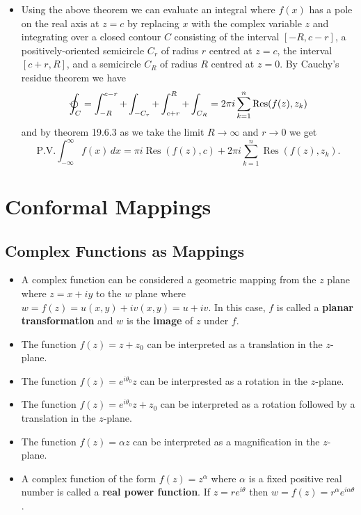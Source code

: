 \documentclass{article}
\newcommand{\Res}{\operatorname{Res}}
\begin{document}
\begin{itemize}
  \item Using the above theorem we can evaluate an integral where $f(x)$ has a pole on the real axis at $z = c$ by replacing $x$ with the complex variable $z$ and integrating over a closed contour $C$ consisting of the interval $[-R, c - r]$, a positively-oriented semicircle $C_r$ of radius $r$ centred at $z = c$, the interval $[c + r, R]$, and a semicircle $C_R$ of radius $R$ centred at $z = 0$. By Cauchy's residue theorem we have \[\varointctrclockwise_C = \int_{-R}^{c - r} + \int_{-C_r} + \int_{c + r}^R + \int_{C_R} = 2 \pi i \sum_{k = 1}^n \Res(f(z), z_k)\] and by theorem 19.6.3 as we take the limit $R \rightarrow \infty$ and $r \rightarrow 0$ we get \[\text{P.V.} \int_{-\infty}^\infty f(x) \,d x = \pi i \Res(f(z), c) + 2 \pi i \sum_{k = 1}^n \Res(f(z), z_k).\]
\end{itemize}

\section{Conformal Mappings}

\subsection{Complex Functions as Mappings}

\begin{itemize}
  \item A complex function can be considered a geometric mapping from the $z$ plane where $z = x + i y$ to the $w$ plane where $w = f(z) = u(x, y) + i v(x, y) = u + i v$. In this case, $f$ is called a \textbf{planar transformation} and $w$ is the \textbf{image} of $z$ under $f$.

  \item The function $f(z) = z + z_0$ can be interpreted as a translation in the $z$-plane.

  \item The function $f(z) = e^{i \theta_0} z$ can be interprested as a rotation in the $z$-plane.

  \item The function $f(z) = e^{i \theta_0} z + z_0$ can be interpreted as a rotation followed by a translation in the $z$-plane.

  \item The function $f(z) = \alpha z$ can be interpreted as a magnification in the $z$-plane.

  \item A complex function of the form $f(z) = z^\alpha$ where $\alpha$ is a fixed positive real number is called a \textbf{real power function}. If $z = r e^{i \theta}$ then $w = f(z) = r^\alpha e^{i \alpha \theta}$.
\end{itemize}
\end{document}
